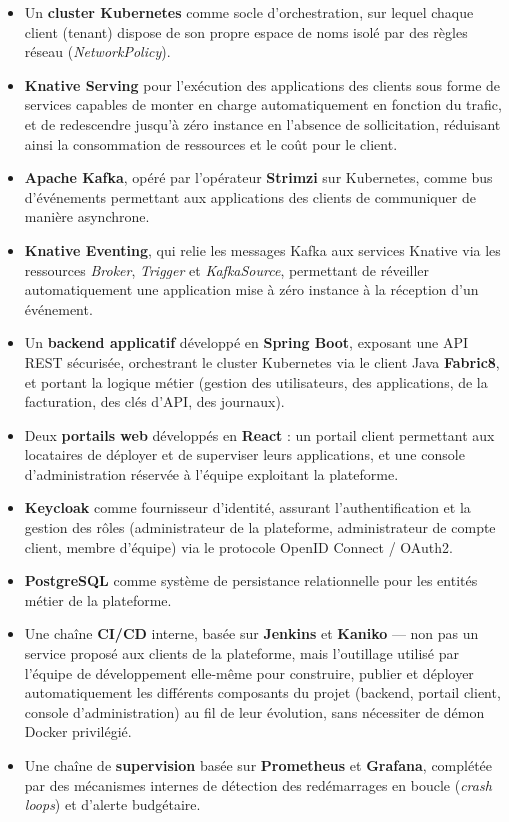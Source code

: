 \begin{itemize}
    \item Un \textbf{cluster Kubernetes} comme socle d'orchestration, sur lequel chaque client (tenant) dispose de son propre espace de noms isolé par des règles réseau (\textit{NetworkPolicy}).
    \item \textbf{Knative Serving} pour l'exécution des applications des clients sous forme de services capables de monter en charge automatiquement en fonction du trafic, et de redescendre jusqu'à zéro instance en l'absence de sollicitation, réduisant ainsi la consommation de ressources et le coût pour le client.
    \item \textbf{Apache Kafka}, opéré par l'opérateur \textbf{Strimzi} sur Kubernetes, comme bus d'événements permettant aux applications des clients de communiquer de manière asynchrone.
    \item \textbf{Knative Eventing}, qui relie les messages Kafka aux services Knative via les ressources \textit{Broker}, \textit{Trigger} et \textit{KafkaSource}, permettant de réveiller automatiquement une application mise à zéro instance à la réception d'un événement.
    \item Un \textbf{backend applicatif} développé en \textbf{Spring Boot}, exposant une API REST sécurisée, orchestrant le cluster Kubernetes via le client Java \textbf{Fabric8}, et portant la logique métier (gestion des utilisateurs, des applications, de la facturation, des clés d'API, des journaux).
    \item Deux \textbf{portails web} développés en \textbf{React} : un portail client permettant aux locataires de déployer et de superviser leurs applications, et une console d'administration réservée à l'équipe exploitant la plateforme.
    \item \textbf{Keycloak} comme fournisseur d'identité, assurant l'authentification et la gestion des rôles (administrateur de la plateforme, administrateur de compte client, membre d'équipe) via le protocole OpenID Connect / OAuth2.
    \item \textbf{PostgreSQL} comme système de persistance relationnelle pour les entités métier de la plateforme.
    \item Une chaîne \textbf{CI/CD} interne, basée sur \textbf{Jenkins} et \textbf{Kaniko} — non pas un service proposé aux clients de la plateforme, mais l'outillage utilisé par l'équipe de développement elle-même pour construire, publier et déployer automatiquement les différents composants du projet (backend, portail client, console d'administration) au fil de leur évolution, sans nécessiter de démon Docker privilégié.
    \item Une chaîne de \textbf{supervision} basée sur \textbf{Prometheus} et \textbf{Grafana}, complétée par des mécanismes internes de détection des redémarrages en boucle (\textit{crash loops}) et d'alerte budgétaire.
\end{itemize}

